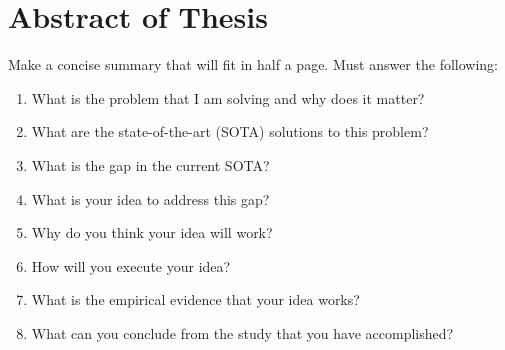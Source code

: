 \chapter{Abstract of Thesis}

Make a concise summary that will fit in half a page. Must answer the following:
\begin{enumerate}
    \item What is the problem that I am solving and why does it matter?
    \item What are the state-of-the-art (SOTA) solutions to this problem?
    \item What is the gap in the current SOTA?
    \item What is your idea to address this gap?
    \item Why do you think your idea will work?
    \item How will you execute your idea?
    \item What is the empirical evidence that your idea works?
    \item What can you conclude from the study that you have accomplished?
\end{enumerate}
